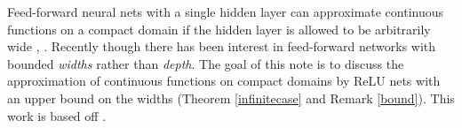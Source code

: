Feed-forward neural nets with a single hidden layer can approximate continuous functions on a compact domain if the hidden layer is allowed to be arbitrarily wide \cite{Cybenko}, \cite{Hornik}. Recently though \cite[\S 3]{Hanin17} there has been interest in feed-forward networks with bounded \emph{widths} rather than \emph{depth}. The goal of this note is to discuss the approximation of continuous functions on compact domains by ReLU nets with an upper bound on the widths (Theorem \ref{infinitecase} and Remark \ref{bound}). This work is based off \cite{Hanin}.